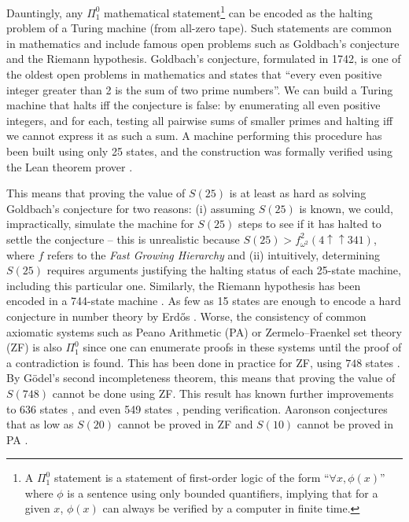 \documentclass[a4paper,british]{article}
\theoremstyle{definition} %
\numberwithin{equation}{section}
\theoremstyle{definition} %
\begin{document}
Dauntingly, any $\Pi_1^0$ mathematical statement\footnote{A $\Pi_1^0$ statement is a statement of first-order logic of the form ``$\forall x, \phi(x)$'' where $\phi$ is a sentence using only bounded quantifiers, implying that for a given $x$, $\phi(x)$ can always be verified by a computer in finite time.} can be encoded as the halting problem of a Turing machine (from all-zero tape). Such statements are common in mathematics and include famous open problems such as Goldbach's conjecture and the Riemann hypothesis. Goldbach's conjecture, formulated in 1742, is one of the oldest open problems in mathematics and states that ``every even positive integer greater than 2 is the sum of two prime numbers''. We can build a Turing machine that halts iff the conjecture is false: by enumerating all even positive integers, and for each, testing all pairwise sums of smaller primes and halting iff we cannot express it as such a sum. A machine performing this procedure has been built using only 25 states, and the construction was formally verified using the Lean theorem prover \cite{GoldbachTM27, GoldbachTM25, DeMouraKongAvigadVanDoornvonRaumer}.


This means that proving the value of $S(25)$ is at least as hard as solving Goldbach's conjecture for two reasons: (i) assuming $S(25)$ is known, we could, impractically, simulate the machine for $S(25)$ steps to see if it has halted to settle the conjecture -- this is unrealistic because $S(25) > f^2_{\omega^2}(4 \uparrow \uparrow 341)$, where $f$ refers to the \textit{Fast Growing Hierarchy} \cite{wikiChampions,wainer1970classification} and (ii) intuitively, determining $S(25)$ requires arguments justifying the halting status of each 25-state machine, including this particular one. Similarly, the Riemann hypothesis has been encoded in a 744-state machine \cite{RiemannTM,Yedidia2016,BusyBeaverFrontier}. As few as 15 states are enough to encode a hard conjecture in number theory by Erd\H{o}s \cite{BB15}. Worse, the consistency of common axiomatic systems such as Peano Arithmetic (PA) or Zermelo–Fraenkel set theory (ZF) is also $\Pi_1^0$ since one can enumerate proofs in these systems until the proof of a contradiction is found. This has been done in practice for ZF, using $748$ states \cite{BB748Thesis,Yedidia2016,BusyBeaverFrontier}. By G\"odel's second incompleteness theorem, this means that proving the value of $S(748)$ cannot be done using ZF. This result has known further improvements to 636 states \cite{RidenourZF636}, and even 549 states \cite{wade2025alignment}, pending verification. Aaronson conjectures that as low as $S(20)$ cannot be proved in ZF and $S(10)$ cannot be proved in PA \cite{BusyBeaverFrontier}.
\end{document}
